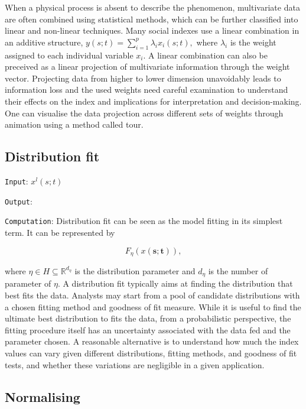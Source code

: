 \documentclass[
]{interact}
\begin{document}
When a physical process is absent to describe the phenomenon,
multivariate data are often combined using statistical methods, which
can be further classified into linear and non-linear techniques. Many
social indexes use a linear combination in an additive structure,
\(y(s; t) = \sum_{i = 1}^{p}\lambda_{i}x_i(s;t),\) where \(\lambda_i\)
is the weight assigned to each individual variable \(x_i\). A linear
combination can also be preceived as a linear projection of multivariate
information through the weight vector. Projecting data from higher to
lower dimension unavoidably leads to information loss and the used
weights need careful examination to understand their effects on the
index and implications for interpretation and decision-making. One can
visualise the data projection across different sets of weights through
animation using a method called tour.

\hypertarget{distribution-fit}{%
\subsection{Distribution fit}\label{distribution-fit}}

\texttt{Input}: \(x^l(s; t)\)

\texttt{Output}:

\texttt{Computation}: Distribution fit can be seen as the model fitting
in its simplest term. It can be represented by

\begin{equation}
F_{\eta}(x(\mathbf{s}; \mathbf{t})), 
\end{equation}

where \(\eta \in H \subseteq \mathbb{R}^{d_{\eta}}\) is the distribution
parameter and \(d_{\eta}\) is the number of parameter of \(\eta\). A
distribution fit typically aims at finding the distribution that best
fits the data. Analysts may start from a pool of candidate distributions
with a chosen fitting method and goodness of fit measure. While it is
useful to find the ultimate best distribution to fits the data, from a
probabilistic perspective, the fitting procedure itself has an
uncertainty associated with the data fed and the parameter chosen. A
reasonable alternative is to understand how much the index values can
vary given different distributions, fitting methods, and goodness of fit
tests, and whether these variations are negligible in a given
application.

\hypertarget{normalising}{%
\subsection{Normalising}\label{normalising}}
\end{document}
